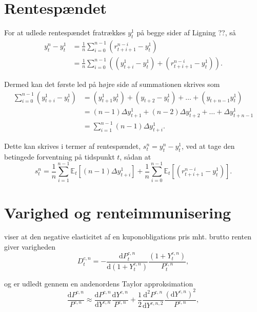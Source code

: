 \documentclass[
  a4paper,
  oneside]{memoir}
\begin{document}
\hypertarget{rentespuxe6ndet}{%
\section{Rentespændet}\label{rentespuxe6ndet}}

For at udlede rentespændet fratrækkes \(y_t^1\) på begge sider af Ligning ??, så
\begin{align}
y_t^n-y_t^1&=\frac{1}{n} \sum_{i=0}^{n-1} (r_{t+i+1}^{n-i}-y_t^1)\\
&=\frac{1}{n} \sum_{i=0}^{n-1} ((y_{t+i}^1-y_t^1) + (r_{t+i+1}^{n-i}-y_t^1)).
\end{align}

Dermed kan det første led på højre side af summationen skrives som
\begin{align}
\sum_{i=0}^{n-1}(y_{t+i}^1-y_t^1)&=(y_{t+1}^1 y_t^1) + (y_{t+2}-y_t^1)+\dots +(y_{t+n-1} y_t^1)\\
&=(n-1)\Delta y_{t+1}^1+(n-2)\Delta y_{t+2}^1 + \dots+ \Delta y_{t+n-1}^1\\
&=\sum_{i=1}^{n-1}  (n-1)\Delta y_{t+i}^1.
\end{align}

Dette kan skrives i termer af rentespændet, \(s_t^n=y_t^n-y_t^1\), ved at tage den betingede forventning på tidspunkt \(t\), sådan at
\begin{equation}
s_t^n=\frac{1}{n} \sum_{i=1}^{n-1} \mathbb{E}_t[(n-1)\Delta y_{t+i}^1] + \frac{1}{n} \sum_{i=0}^{n-1} \mathbb{E}_t[(r_{t+i+1}^{n-i} - y_t^1)].
\end{equation}

\hypertarget{varighed-og-renteimmunisering}{%
\section{Varighed og renteimmunisering}\label{varighed-og-renteimmunisering}}

\citep{Macaulay1938} viser at den negative elasticitet af en kuponobligations pris mht. brutto renten giver varigheden
\begin{equation}
D_t^{c,n} = -\frac{\text{d} P_t^{c,n}}{\text{d}(1+Y_t^{c,n})}\frac{(1+Y_t^{c,n})}{P_t^{c,n}},
\end{equation}

og er udledt gennem en andenordens Taylor approksimation
\begin{equation}
\frac{\text{d} P^{c,n}}{P^{c,n}}\approx \frac{\text{d} P^{c,n}}{\text{d} Y^{c,n}}\frac{\text{d} Y^{c,n}}{P^{c,n}}+\frac{1}{2}\frac{\text{d}^2 P^{c,n}}{\text{d} Y^{c,n,2}}\frac{(\text{d}Y^{c,n})^2}{P^{c,n}},
\end{equation}
\end{document}

